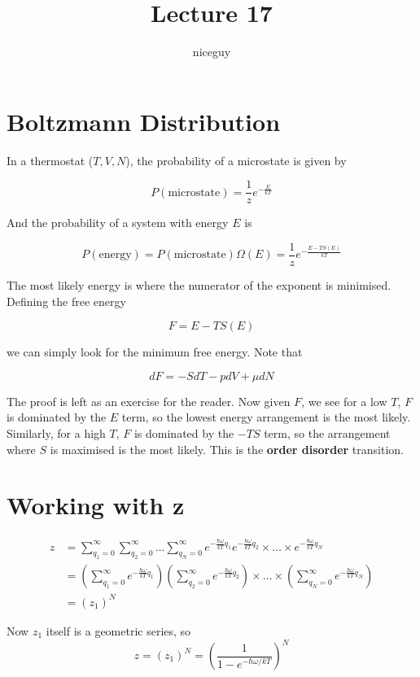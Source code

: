 \documentclass[12pt]{article}
\author{niceguy}
\title{Lecture 17}
\begin{document}
\maketitle

\section{Boltzmann Distribution}

In a thermostat ($T,V,N$), the probability of a microstate is given by

$$P(\text{microstate}) = \frac{1}{z} e^{-\frac{E}{kT}}$$

And the probability of a system with energy $E$ is

$$P(\text{energy}) = P(\text{microstate})\Omega(E) = \frac{1}{z} e^{-\frac{E-TS(E)}{kT}}$$

The most likely energy is where the numerator of the exponent is minimised. Defining the free energy

$$F = E-TS(E)$$

we can simply look for the minimum free energy. Note that

$$dF = -SdT - pdV + \mu dN$$

The proof is left as an exercise for the reader. Now given $F$, we see for a low $T$, $F$ is dominated by the $E$ term, so the lowest energy arrangement is the most likely. Similarly, for a high $T$, $F$ is dominated by the $-TS$ term, so the arrangement where $S$ is maximised is the most likely. This is the \textbf{order disorder} transition.

\section{Working with z}

\begin{align*}
    z &= \sum_{q_1=0}^\infty \sum_{q_2=0}^\infty \dots \sum_{q_N=0}^\infty e^{-\frac{\hbar\omega}{kT}q_1} e^{-\frac{\hbar\omega}{kT}q_2} \times \dots \times e^{-\frac{\hbar\omega}{kT}q_N} \\
      &= \left(\sum_{q_1=0}^\infty e^{-\frac{\hbar\omega}{kT}q_1}\right)\left(\sum_{q_2=0}^\infty e^{-\frac{\hbar\omega}{kT}q_2}\right)\times\dots\times\left(\sum_{q_N=0}^\infty e^{-\frac{\hbar\omega}{kT}q_N}\right) \\
      &= (z_1)^N
\end{align*}

Now $z_1$ itself is a geometric series, so
$$z = (z_1)^N = \left(\frac{1}{1-e^{-\hbar\omega/kT}}\right)^N$$
\end{document}
